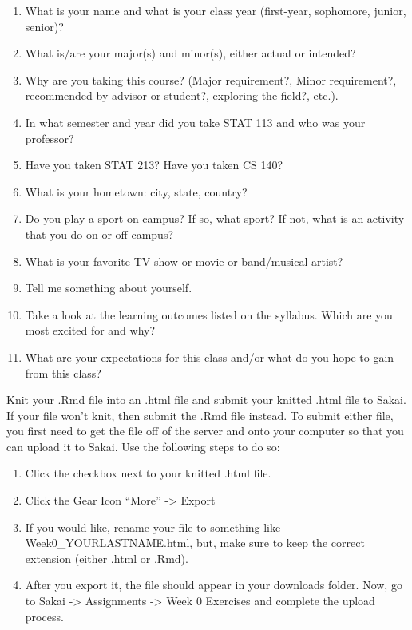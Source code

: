 \documentclass[
]{book}
\begin{document}
\begin{enumerate}
\def\labelenumi{\alph{enumi}.}
\item
  What is your name and what is your class year (first-year, sophomore, junior, senior)?
\item
  What is/are your major(s) and minor(s), either actual or intended?
\item
  Why are you taking this course? (Major requirement?, Minor requirement?, recommended by advisor or student?, exploring the field?, etc.).
\item
  In what semester and year did you take STAT 113 and who was your professor?
\item
  Have you taken STAT 213? Have you taken CS 140?
\item
  What is your hometown: city, state, country?
\item
  Do you play a sport on campus? If so, what sport? If not, what is an activity that you do on or off-campus?
\item
  What is your favorite TV show or movie or band/musical artist?
\item
  Tell me something about yourself.
\item
  Take a look at the learning outcomes listed on the syllabus. Which are you most excited for and why?
\item
  What are your expectations for this class and/or what do you hope to gain from this class?
\end{enumerate}

Knit your .Rmd file into an .html file and submit your knitted .html file to Sakai. If your file won't knit, then submit the .Rmd file instead. To submit either file, you first need to get the file off of the server and onto your computer so that you can upload it to Sakai. Use the following steps to do so:

\begin{enumerate}
\def\labelenumi{\arabic{enumi}.}
\item
  Click the checkbox next to your knitted .html file.
\item
  Click the Gear Icon ``More'' -\textgreater{} Export
\item
  If you would like, rename your file to something like Week0\_YOURLASTNAME.html, but, make sure to keep the correct extension (either .html or .Rmd).
\item
  After you export it, the file should appear in your downloads folder. Now, go to Sakai -\textgreater{} Assignments -\textgreater{} Week 0 Exercises and complete the upload process.
\end{enumerate}
\end{document}
